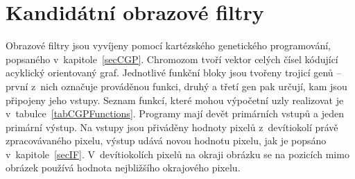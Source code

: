 \section{Kandidátní obrazové filtry}
\label{secDesignIF}

Obrazové filtry jsou vyvíjeny pomocí kartézského genetického programování, popsaného v~kapitole~\ref{secCGP}. Chromozom tvoří vektor celých čísel kódující acyklický orientovaný graf. Jednotlivé funkční bloky jsou tvořeny trojicí genů -- první z~nich označuje prováděnou funkci, druhý a třetí gen pak určují, kam jsou připojeny jeho vstupy. Seznam funkcí, které mohou výpočetní uzly realizovat je v~tabulce~\ref{tabCGPFunctions}. Programy mají devět primárních vstupů a jeden primární výstup. Na vstupy jsou přiváděny hodnoty pixelů z~devítiokolí právě zpracovávaného pixelu, výstup udává novou hodnotu pixelu, jak je popsáno v~kapitole~\ref{secIF}. V~devítiokolích pixelů na okraji obrázku se na pozicích mimo obrázek používá hodnota nejbližšího okrajového pixelu.

